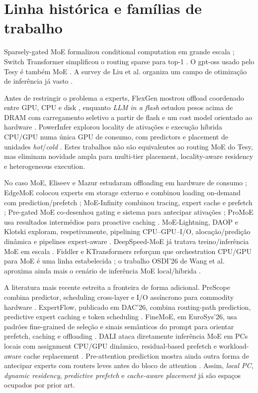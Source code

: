 \section{Linha histórica e famílias de trabalho}
Sparsely-gated MoE formalizou conditional computation em grande escala \cite{shazeer2017moe}; Switch Transformer simplificou o routing sparse para top-1 \cite{fedus2022switch}. O gpt-oss usado pelo Tesy é também MoE \cite{openai2025gptoss}. A survey de Liu et al. organiza um campo de otimização de inferência já vasto \cite{liu2026survey}.

Antes de restringir o problema a experts, FlexGen mostrou offload coordenado entre GPU, CPU e disk \cite{sheng2023flexgen}, enquanto \emph{LLM in a flash} estudou pesos acima de DRAM com carregamento seletivo a partir de flash e um cost model orientado ao hardware \cite{alizadeh2024llmflash}. PowerInfer explorou locality de ativações e execução híbrida CPU/GPU numa única GPU de consumo, com predictors e placement de unidades \emph{hot}/\emph{cold} \cite{song2024powerinfer}. Estes trabalhos não são equivalentes ao routing MoE do Tesy, mas eliminam novidade ampla para multi-tier placement, locality-aware residency e heterogeneous execution.

No caso MoE, Eliseev e Mazur estudaram offloading em hardware de consumo \cite{eliseev2023offloading}; EdgeMoE colocou experts em storage externo e combinou loading on-demand com prediction/prefetch \cite{yi2023edgemoe}; MoE-Infinity combinou tracing, expert cache e prefetch \cite{xue2024moeinfinity}; Pre-gated MoE co-desenhou gating e sistema para antecipar ativações \cite{hwang2024pregated}; ProMoE usa resultados intermédios para proactive caching \cite{song2024promoe}. MoE-Lightning, DAOP e Klotski exploram, respetivamente, pipelining CPU--GPU--I/O, alocação/predição dinâmica e pipelines expert-aware \cite{cao2025moelightning,zhang2025daop,fang2025klotski}. DeepSpeed-MoE já tratava treino/inferência MoE em escala \cite{rajbhandari2022deepspeedmoe}. Fiddler e KTransformers reforçam que orchestration CPU/GPU para MoE é uma linha estabelecida \cite{kamahori2025fiddler,chen2025ktransformers}; o trabalho OSDI'26 de Wang et al. aproxima ainda mais o cenário de inferência MoE local/híbrida \cite{wang2026localslo}.

A literatura mais recente estreita a fronteira de forma adicional. PreScope combina predictor, scheduling cross-layer e I/O assíncrono para commodity hardware \cite{yu2025prescope}. ExpertFlow, publicado em DAC'26, combina routing-path prediction, predictive expert caching e token scheduling \cite{he2026expertflow}. FineMoE, em EuroSys'26, usa padrões fine-grained de seleção e sinais semânticos do prompt para orientar prefetch, caching e offloading \cite{yu2026finemoe}. DALI ataca diretamente inferência MoE em PCs locais com assignment CPU/GPU dinâmico, residual-based prefetch e workload-aware cache replacement \cite{zhu2026dali}. Pre-attention prediction mostra ainda outra forma de antecipar experts com routers leves antes do bloco de attention \cite{zhu2025preattention}. Assim, \emph{local PC}, \emph{dynamic residency}, \emph{predictive prefetch} e \emph{cache-aware placement} já são espaços ocupados por prior art.

